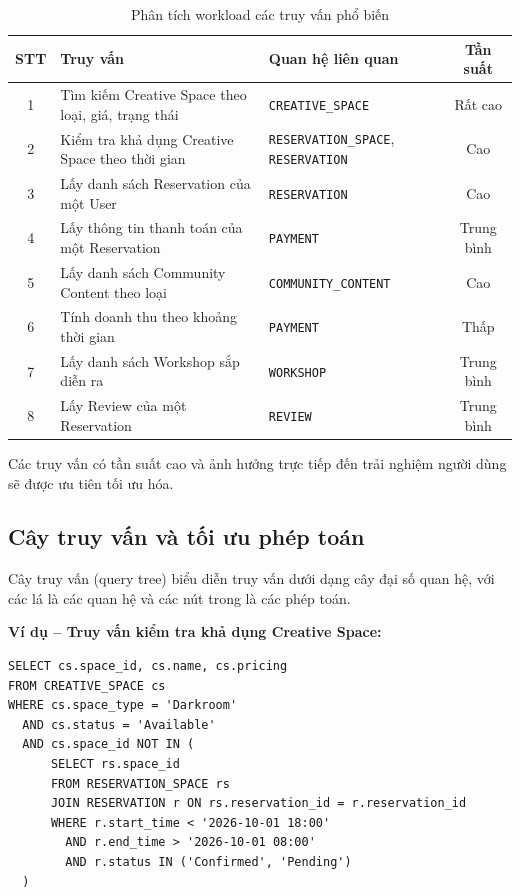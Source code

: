 \begin{table}[htbp]
\centering
\begin{tabularx}{\linewidth}{|c|X|p{3.5cm}|c|}
\hline
\textbf{STT} & \textbf{Truy vấn} & \textbf{Quan hệ liên quan} & \textbf{Tần suất} \\
\hline
1 & Tìm kiếm Creative Space theo loại, giá, trạng thái & \texttt{CREATIVE\_SPACE} & Rất cao \\
\hline
2 & Kiểm tra khả dụng Creative Space theo thời gian & \texttt{RESERVATION\_SPACE}, \texttt{RESERVATION} & Cao \\
\hline
3 & Lấy danh sách Reservation của một User & \texttt{RESERVATION} & Cao \\
\hline
4 & Lấy thông tin thanh toán của một Reservation & \texttt{PAYMENT} & Trung bình \\
\hline
5 & Lấy danh sách Community Content theo loại & \texttt{COMMUNITY\_CONTENT} & Cao \\
\hline
6 & Tính doanh thu theo khoảng thời gian & \texttt{PAYMENT} & Thấp \\
\hline
7 & Lấy danh sách Workshop sắp diễn ra & \texttt{WORKSHOP} & Trung bình \\
\hline
8 & Lấy Review của một Reservation & \texttt{REVIEW} & Trung bình \\
\hline
\end{tabularx}
\caption{Phân tích workload các truy vấn phổ biến}
\end{table}

Các truy vấn có tần suất cao và ảnh hưởng trực tiếp đến trải nghiệm người dùng sẽ được ưu tiên tối ưu hóa.

\subsection{Cây truy vấn và tối ưu phép toán}

Cây truy vấn (query tree) biểu diễn truy vấn dưới dạng cây đại số quan hệ, với các lá là các quan hệ và các nút trong là các phép toán.

\textbf{Ví dụ -- Truy vấn kiểm tra khả dụng Creative Space:}

\begin{verbatim}
SELECT cs.space_id, cs.name, cs.pricing
FROM CREATIVE_SPACE cs
WHERE cs.space_type = 'Darkroom'
  AND cs.status = 'Available'
  AND cs.space_id NOT IN (
      SELECT rs.space_id
      FROM RESERVATION_SPACE rs
      JOIN RESERVATION r ON rs.reservation_id = r.reservation_id
      WHERE r.start_time < '2026-10-01 18:00'
        AND r.end_time > '2026-10-01 08:00'
        AND r.status IN ('Confirmed', 'Pending')
  )
\end{verbatim}

